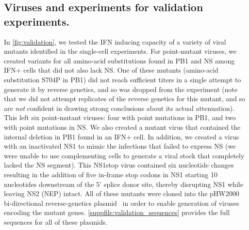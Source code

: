 \documentclass[]{asm-article}
\newcommand{\FIG}[1]{\autoref{fig:#1}}
\newcommand{\SUPPFILE}[1]{\autoref{suppfile:#1}}
\begin{document}
\subsection{Viruses and experiments for validation experiments.}
In \FIG{validation}, we tested the IFN inducing capacity of a variety of viral mutants identified in the single-cell experiments.
For point-mutant viruses, we created variants for all amino-acid substitutions found in PB1 and NS among IFN+ cells that did not also lack NS.
One of these mutants (amino-acid substitution S704P in PB1) did not reach sufficient titers in a single attempt to generate it by reverse genetics, and so was dropped from the experiment (note that we did not attempt replicates of the reverse genetics for this mutant, and so are \emph{not} confident in drawing strong conclusions about its actual attenuation).
This left six point-mutant viruses: four with point mutations in PB1, and two with point mutations in NS.
We also created a mutant virus that contained the internal deletion in PB1 found in an IFN+ cell.
In addition, we created a virus with an inactivated NS1 to mimic the infections that failed to express NS (we were unable to use complementing cells to generate a viral stock that completely lacked the NS segment).
This NS1stop virus contained six nucleotide changes resulting in the addition of five in-frame stop codons in NS1 starting 10 nucleotides downstream of the 5' splice donor site, thereby disrupting NS1 while leaving NS2 (NEP) intact.
All of these mutants were cloned into the pHW2000 bi-directional reverse-genetics plasmid~\cite{hoffmann2000dna} in order to enable generation of viruses encoding the mutant genes.
 \SUPPFILE{validation_sequences} provides the full sequences for all of these plasmids.
\end{document}
